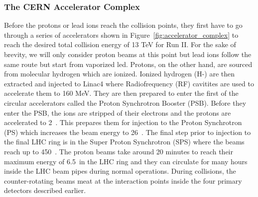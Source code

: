\subsubsection{The CERN Accelerator Complex}

Before the protons or lead ions reach the collision points, they first have to go through a series of accelerators shown in Figure~\ref{fig:accelerator_complex} to reach the desired total collision energy of 13 TeV for Run II. For the sake of brevity, we will only consider proton beams at this point but lead ions follow the same route but start from vaporized led. Protons, on the other hand, are sourced from molecular hydrogen which are ionized. Ionized hydrogen (H-) are then extracted and injected to Linac4 where Radiofrequency (RF) cavitites are used to accelerate them to 160 MeV. They are then prepared to enter the first of the circular accelerators called the Proton Synchrotron Booster (PSB). Before they enter the PSB, the ions are stripped of their electrons and the protons are accelerated to 2~\GeV. This prepares them for injection to the Proton Synchrotron (PS) which increases the beam energy to 26~\GeV. The final step prior to injection to the final LHC ring is in the Super Proton Synchrotron (SPS) where the beams reach up to 450~\GeV.
The proton beams take around 20 minutes to reach their maximum energy of 6.5~\TeV in the LHC ring and they can circulate for many hours inside the LHC beam pipes during normal operations. During collisions, the counter-rotating beams meat at the interaction points inside the four primary detectors described earlier.




